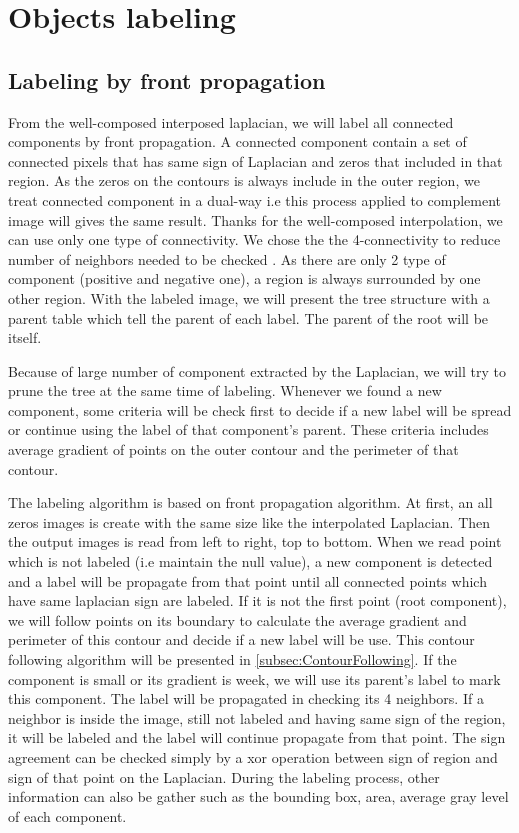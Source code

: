 \section{Objects labeling}

\subsection{Labeling by front propagation} \label{labeling}
\par From the well-composed interposed laplacian, we will label all connected components by front propagation. A connected component contain a set of connected pixels that has same sign of Laplacian and zeros that included in that region. As the zeros on the contours is always include in the outer region, we treat connected component in a dual-way i.e this process applied to complement image will gives the same result. Thanks for the well-composed interpolation, we can use only one type of connectivity. We chose the the 4-connectivity to reduce number of neighbors needed to be checked . As there are only 2 type of component (positive and negative one), a region is always surrounded by one other region. With the labeled image, we will present the tree structure with a parent table which tell the parent of each label. The parent of the root will be itself.
\par
Because of large number of component extracted by the Laplacian, we will try to prune the tree at the same time of labeling. Whenever we found a new component, some criteria will be check first to decide if a new label will be spread or continue using the label of that component's parent. These criteria includes average gradient of points on the outer contour and the perimeter of that contour.  
\par
The labeling algorithm is based on front propagation algorithm. At first, an all zeros images is create with the same size like the interpolated Laplacian. Then the output images is read from left to right, top to bottom. When we read point which is not labeled (i.e maintain the null value), a new component is detected and a label will be propagate from that point until all connected points which have same laplacian sign are labeled. If it is not the first point (root component), we will follow points on its boundary to calculate the average gradient and perimeter of this contour and decide if a new label will be use. This contour following algorithm will be presented in \ref{subsec:ContourFollowing}. If the component is small or its gradient is week, we will use its parent's label to mark this component. The label will be propagated in checking its 4 neighbors. If a neighbor is inside the image, still not labeled and having same sign of the region, it will be labeled and the label will continue propagate from that point. The sign agreement can be checked simply by a xor operation between sign of region and sign of that point on the Laplacian. During the labeling process, other information can also be gather such as the bounding box, area, average gray level of each component. 
